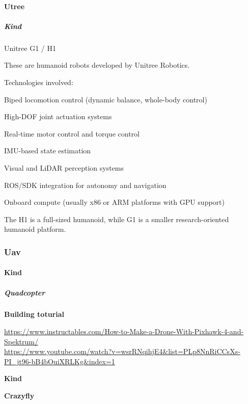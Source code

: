 \documentclass{book}
\providecommand{\ProjectDeepHeading}[2]{%
    \par\medskip\noindent\textbf{#2}\par\smallskip
}
\begin{document}
\paragraph{Utree}

\subparagraph{Kind}


Unitree G1 / H1

    These are humanoid robots developed by Unitree Robotics.
    
    Technologies involved:
    
    Biped locomotion control (dynamic balance, whole-body control)
    
    High-DOF joint actuation systems
    
    Real-time motor control and torque control
    
    IMU-based state estimation
    
    Visual and LiDAR perception systems
    
    ROS/SDK integration for autonomy and navigation
    
    Onboard compute (usually x86 or ARM platforms with GPU support)
    
    The H1 is a full-sized humanoid, while G1 is a smaller research-oriented humanoid platform.

\subsubsection{Uav}

\paragraph{Kind}

\subparagraph{Quadcopter}

\ProjectDeepHeading{1}{Building toturial}


\url{https://www.instructables.com/How-to-Make-a-Drone-With-Pixhawk-4-and-Spektrum/}
    \\
    \url{https://www.youtube.com/watch?v=wsrRNqihjE4&list=PLp8NnRiCCsXs-PI_jt96-bB4bOuiXRLKg&index=1}
    

\ProjectDeepHeading{1}{Kind}

\ProjectDeepHeading{2}{Crazyfly}
\end{document}

